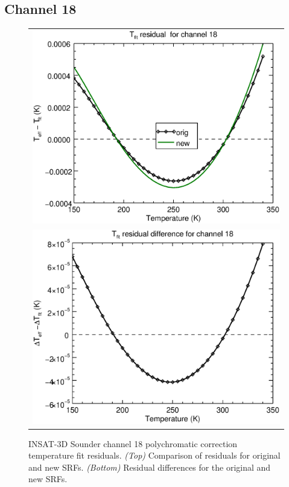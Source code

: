 \subsection{Channel 18}
\begin{figure}[H]
  \centering
  \begin{tabular}{c}
    \includegraphics[scale=0.55]{graphics/sndr/tfit/sndr_insat3d-18.tfit.eps} \\
    \includegraphics[scale=0.55]{graphics/sndr/tfit/sndr_insat3d-18.tfit.difference.eps}
  \end{tabular}
  \caption{INSAT-3D Sounder channel 18 polychromatic correction temperature fit residuals. \emph{(Top)} Comparison of residuals for original and new SRFs. \emph{(Bottom)} Residual differences for the original and new SRFs.}
  \label{fig:sndr_ch18_tfit}
\end{figure}
